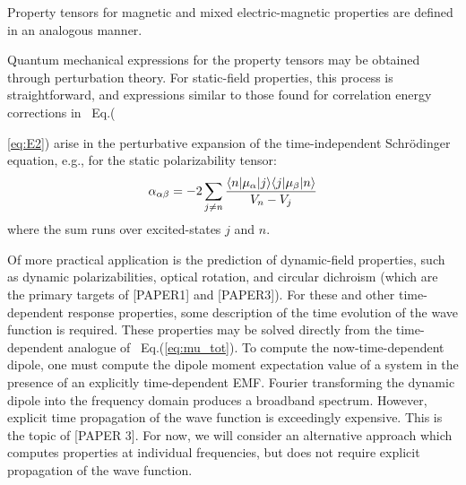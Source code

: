 Property tensors for magnetic and mixed electric-magnetic properties are defined in an 
analogous manner.\cite{Barron2004} 

Quantum mechanical expressions for the property tensors may be obtained through perturbation theory. 
For static-field properties, this process is straightforward, and expressions similar to those found for
correlation energy corrections in ~Eq.({\ref{eq:E2}) arise in the perturbative expansion of the time-independent Schr\"odinger
equation, e.g., for the static polarizability tensor:
\begin{equation} \label{eq:static_pol}
\alpha_{\alpha\beta} = -2\sum_{j\neq n}\frac{\langle n |\mu_\alpha| j \rangle\langle j |\mu_\beta| n \rangle}{V_n - V_j} 
\end{equation}
where the sum runs over excited-states $j$ and $n$.

Of more practical application is the prediction of dynamic-field properties, such as dynamic polarizabilities, 
optical rotation, and circular dichroism (which are the primary targets of [PAPER1] and [PAPER3]).
For these and other time-dependent response properties, some description of the time evolution of the wave function is
required. 
These properties may be solved directly from the time-dependent analogue of ~Eq.(\ref{eq:mu_tot}). 
To compute the now-time-dependent dipole, one must compute the dipole moment expectation value of a system 
in the presence of an explicitly time-dependent EMF.
Fourier transforming the dynamic dipole into the frequency domain produces a  broadband spectrum.
However, explicit time propagation of the wave function is exceedingly expensive.\cite{Goings2018} 
This is the topic of [PAPER 3]. 
For now, we will consider an alternative approach which computes properties at individual frequencies, 
but does not require explicit propagation of the wave function. 

}
